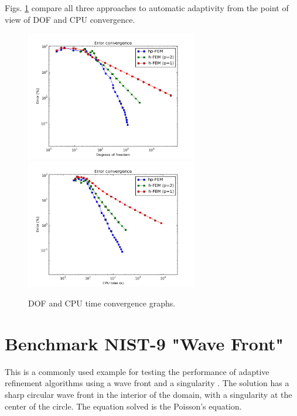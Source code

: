 \documentclass[12pt]{elsarticle}
\begin{document}
Figs. \ref{fig:nist-8-conv} compare all
three approaches to automatic adaptivity from the point
of view of DOF and CPU convergence.
\vspace{-5mm}

\begin{figure}[H]
\centering
\hspace{-50mm}
\includegraphics[width=7.5cm]{nist/nist-8/conv_dof_aniso.png}\ \
\hspace{-10mm}
\includegraphics[width=7.5cm]{nist/nist-8/conv_cpu_aniso.png}
\hspace{-50mm}
\caption{DOF and CPU time convergence graphs.}
\vspace{-3mm}
\label{fig:nist-8-conv}
\end{figure}


\section{Benchmark NIST-9 "Wave Front"}
\label{sec:bench-9}

This is a commonly used example for testing the performance of
adaptive refinement algorithms using a wave front and a singularity \cite{mitchell-1, mitchell-2}.
The solution has a sharp circular wave front in the interior of the
domain, with a singularity at the center of the circle.
The equation solved is the Poisson's equation.
\end{document}
